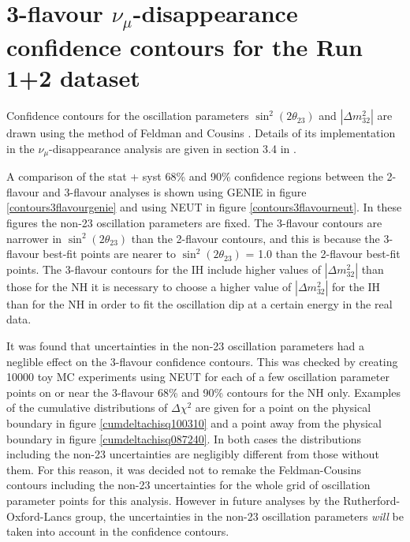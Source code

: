 \clearpage

\section{3-flavour $\nu_{\mu}$-disappearance confidence contours for the Run 1+2 dataset}
\label{sec:conf_regions}

Confidence contours for the oscillation parameters $\sin^{2}(2 \theta_{23})$ and $|\Delta m_{32}^{2}|$ are drawn using the method 
of Feldman and Cousins \cite{FeldmanCousins}. Details of its implementation in the $\nu_{\mu}$-disappearance analysis are given in 
section 3.4 in \cite{OurRun1DisappAnalysis2F}.

A comparison of the stat + syst 68\% and 90\% confidence regions between the 2-flavour \cite{OurRun1and2Analysis2F} and 3-flavour 
analyses is shown using GENIE in figure \ref{contours3flavourgenie} and using NEUT in figure \ref{contours3flavourneut}. In these 
figures the non-23 oscillation parameters are fixed. The 3-flavour contours are 
narrower in $\sin^{2}(2 \theta_{23})$ than the 2-flavour contours, and this is because the 3-flavour best-fit points are nearer to 
$\sin^{2}(2 \theta_{23})$ = 1.0 than the 2-flavour best-fit points. The 3-flavour contours for the IH include higher values of 
$|\Delta m_{32}^{2}|$ than those for the NH it is necessary to choose a higher value of $|\Delta m_{32}^{2}|$ for the IH than for the NH 
in order to fit the oscillation dip at a certain energy in the real data.

It was found that uncertainties in the non-23 oscillation parameters had a neglible effect on the 3-flavour confidence contours. This was 
checked by creating 10000 toy MC experiments using NEUT for each of a few oscillation parameter points on or near the 3-flavour 68\% and 90\% 
contours for the NH only. Examples of the cumulative distributions of $\Delta\chi^{2}$ are given for a point on the physical 
boundary in figure \ref{cumdeltachisq100310} and a point away from the physical boundary in figure \ref{cumdeltachisq087240}. In both 
cases the distributions including the non-23 uncertainties are negligibly different from those without them. For this reason, it was decided 
not to remake the Feldman-Cousins contours including the non-23 uncertainties for the whole grid of oscillation parameter points for this 
analysis. However in future analyses by the Rutherford-Oxford-Lancs group, the uncertainties in the non-23 oscillation parameters \emph{will} 
be taken into account in the confidence contours.

